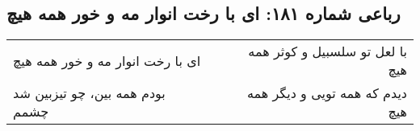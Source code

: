\begin{center}
\section*{رباعی شماره ۱۸۱: ای با رخت انوار مه و خور همه هیچ}
\label{sec:sh181}
\begin{longtable}{l p{0.5cm} r}
ای با رخت انوار مه و خور همه هیچ
&&
با لعل تو سلسبیل و کوثر همه هیچ
\\
بودم همه بین، چو تیزبین شد چشمم
&&
دیدم که همه تویی و دیگر همه هیچ
\\
\end{longtable}
\end{center}
